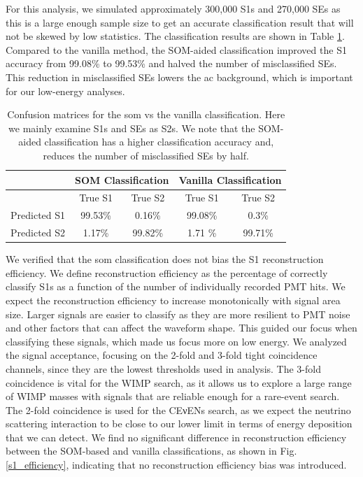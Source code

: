 For this analysis, we simulated approximately 300,000 S1s and 270,000 SEs as this is a large enough sample size to get an accurate classification result that will not be skewed by low statistics. The classification results are shown in Table \ref{som_peaklet_sr1_conf_mat}. Compared to the vanilla method, the SOM-aided classification improved the S1 accuracy from 99.08\% to 99.53\% and halved the number of misclassified SEs. This reduction in misclassified SEs lowers the \acrshort{ac} background, which is important for our low-energy analyses.


\begin{table}[t]
\centering
\begin{tabular}{c|c|c|c|c}
    & \multicolumn{2}{c}{SOM Classification} & \multicolumn{2}{|c}{Vanilla Classification} \\
    \hline
    & True S1 &  True S2 & True S1 &  True S2 \\
    \hline
    Predicted S1 & 99.53\% & 0.16\% & 99.08\% & 0.3\% \\
    \hline
    Predicted S2 &  1.17\% & 99.82\% & 1.71 \% & 99.71\%  \\
\end{tabular}
    \caption{Confusion matrices for the \acrshort{som} vs the vanilla classification. Here we mainly examine S1s and SEs as S2s. We note that the SOM-aided classification has a higher classification accuracy and, reduces the number of misclassified SEs by half.}
    \label{som_peaklet_sr1_conf_mat}
\end{table}

We verified that the \acrshort{som} classification does not bias the S1 reconstruction efficiency. We define reconstruction efficiency as the percentage of correctly classify S1s as a function of the number of individually recorded PMT hits.
We expect the reconstruction efficiency to increase monotonically with signal area size. Larger signals are easier to classify as they are more resilient to PMT noise and other factors that can affect the waveform shape. This guided our focus when classifying these signals, which made us focus more on low energy.
We analyzed the signal acceptance, focusing on the 2-fold and 3-fold tight coincidence channels, since they are the lowest thresholds used in analysis. The 3-fold coincidence is vital for the WIMP search, as it allows us to explore a large range of WIMP masses with signals that are reliable enough for a rare-event search.
The 2-fold coincidence is used for the CEνENs search, as we expect the neutrino scattering interaction to be close to our lower limit in terms of energy deposition that we can detect. We find no significant difference in reconstruction efficiency between the SOM-based and vanilla classifications, as shown in Fig. \ref{s1_efficiency}, indicating that no reconstruction efficiency bias was introduced.

